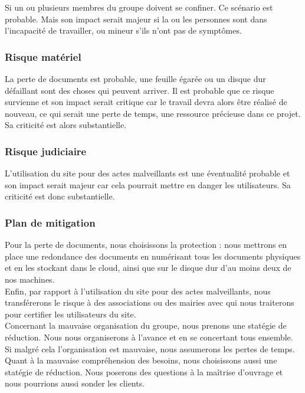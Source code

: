 \documentclass[a4paper,11pt]{article}
\begin{document}
Si un ou plusieurs membres du groupe doivent se confiner. Ce scénario est probable. Mais son impact
serait majeur si la ou les personnes sont dans l’incapacité de travailler, ou mineur s’ils n’ont pas de
symptômes.\\

\subsubsection{Risque matériel}

La perte de documents est probable, une feuille égarée ou un disque dur défaillant sont des choses
qui peuvent arriver. Il est probable que ce risque survienne et son impact serait critique car le travail
devra alors être réalisé de nouveau, ce qui serait une perte de temps, une ressource précieuse dans
ce projet. Sa criticité est alors substantielle.\\

\subsubsection{Risque judiciaire}

L’utilisation du site pour des actes malveillants est une éventualité probable et son impact serait
majeur car cela pourrait mettre en danger les utilisateurs. Sa criticité est donc substantielle.\\

\subsubsection{Plan de mitigation}

Pour la perte de documents, nous choisissons la protection : nous mettrons en place une redondance
des documents en numérisant tous les documents physiques et en les stockant dans le cloud, ainsi
que sur le disque dur d’au moins deux de nos machines.\\

Enfin, par rapport à l’utilisation du site pour des actes malveillants, nous transférerons le risque à des
associations ou des mairies avec qui nous traiterons pour certifier les utilisateurs du site.\\

Concernant la mauvaise organisation du groupe, nous prenons une statégie de réduction. Nous nous organiserons
à l'avance et en se concertant tous ensemble. Si malgré cela l'organisation est mauvaise, nous
assumerons les pertes de temps. Quant à la mauvaise compréhension des besoins, nous choisissons
aussi une statégie de réduction. Nous poserons des questions à la maîtrise d'ouvrage et nous pourrions aussi sonder
les clients.\\
\end{document}
